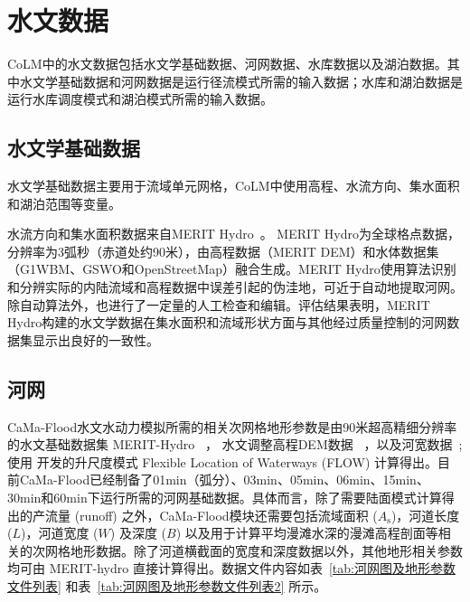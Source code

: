 \section{水文数据}\label{水文数据}

CoLM中的水文数据包括水文学基础数据、河网数据、水库数据以及湖泊数据。其中水文学基础数据和河网数据是运行径流模式所需的输入数据；水库和湖泊数据是运行水库调度模式和湖泊模式所需的输入数据。

\subsection{水文学基础数据}
水文学基础数据主要用于流域单元网格，CoLM中使用高程、水流方向、集水面积和湖泊范围等变量。

水流方向和集水面积数据来自MERIT Hydro~\citep{yamazaki2019merit}。 MERIT Hydro为全球格点数据，分辨率为3弧秒（赤道处约90米），由高程数据（MERIT DEM）和水体数据集（G1WBM、GSWO和OpenStreetMap）融合生成。MERIT Hydro使用算法识别和分辨实际的内陆流域和高程数据中误差引起的伪洼地，可近于自动地提取河网。除自动算法外，也进行了一定量的人工检查和编辑。评估结果表明，MERIT Hydro构建的水文学数据在集水面积和流域形状方面与其他经过质量控制的河网数据集显示出良好的一致性。

\subsection{河网}
CaMa-Flood水文水动力模拟所需的相关次网格地形参数是由90米超高精细分辨率的水文基础数据集 MERIT-Hydro ~\citep{yamazaki2019merit}，
水文调整高程DEM数据 ~\citep{yamazaki2017high,yamazaki2012analysis}，以及河宽数据~\citep{yamazaki2014development};
使用 \citet{yamazaki2009deriving} 开发的升尺度模式 Flexible Location of Waterways (FLOW) 计算得出。目前CaMa-Flood已经制备了01min（弧分）、03min、05min、06min、15min、30min和60min下运行所需的河网基础数据。具体而言，除了需要陆面模式计算得出的产流量 (runoff) 之外，CaMa-Flood模块还需要包括流域面积 ($A_{\mathrm {s}} $)，河道长度 ($L$)，河道宽度 ($W$) 及深度 ($B$) 以及用于计算平均漫滩水深的漫滩高程剖面等相关的次网格地形数据。除了河道横截面的宽度和深度数据以外，其他地形相关参数均可由 MERIT-hydro 直接计算得出。数据文件内容如表~\ref{tab:河网图及地形参数文件列表} 和表~\ref{tab:河网图及地形参数文件列表2} 所示。 

